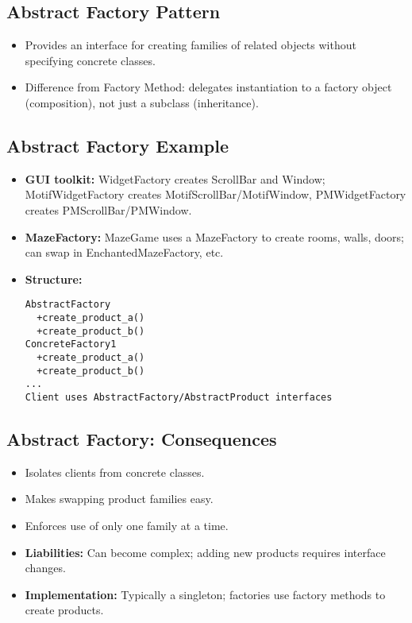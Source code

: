 \documentclass[11pt,a4paper]{article}
\begin{document}
\subsection*{Abstract Factory Pattern}
\begin{itemize}
    \item Provides an interface for creating families of related objects without specifying concrete classes.
    \item Difference from Factory Method: delegates instantiation to a factory object (composition), not just a subclass (inheritance).
\end{itemize}

\subsection*{Abstract Factory Example}
\begin{itemize}
    \item \textbf{GUI toolkit:} WidgetFactory creates ScrollBar and Window; MotifWidgetFactory creates MotifScrollBar/MotifWindow, PMWidgetFactory creates PMScrollBar/PMWindow.
    \item \textbf{MazeFactory:} MazeGame uses a MazeFactory to create rooms, walls, doors; can swap in EnchantedMazeFactory, etc.
    \item \textbf{Structure:}
        \begin{verbatim}
AbstractFactory
  +create_product_a()
  +create_product_b()
ConcreteFactory1
  +create_product_a()
  +create_product_b()
...
Client uses AbstractFactory/AbstractProduct interfaces
        \end{verbatim}
\end{itemize}

\subsection*{Abstract Factory: Consequences}
\begin{itemize}
    \item Isolates clients from concrete classes.
    \item Makes swapping product families easy.
    \item Enforces use of only one family at a time.
    \item \textbf{Liabilities:} Can become complex; adding new products requires interface changes.
    \item \textbf{Implementation:} Typically a singleton; factories use factory methods to create products.
\end{itemize}
\end{document}
